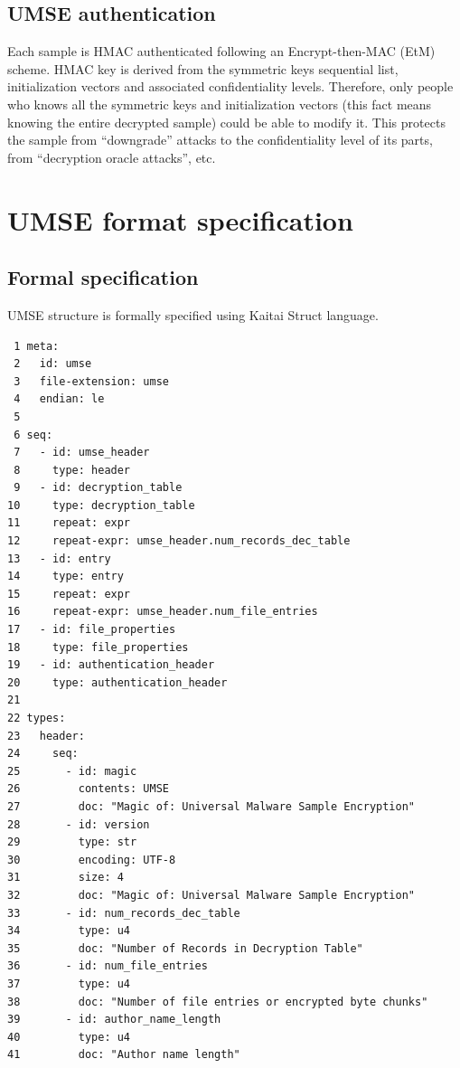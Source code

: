 \subsection{UMSE authentication}

Each sample is HMAC authenticated following an Encrypt-then-MAC (EtM)
scheme\cite{AuthenticatedEncryption2000}. HMAC key is derived from the symmetric keys sequential list,
initialization vectors and associated confidentiality levels. Therefore, only
people who knows all the symmetric keys and initialization vectors (this fact
means knowing the entire decrypted sample) could be able to modify it. This
protects the sample from ``downgrade'' attacks to the confidentiality level of
its parts, from ``decryption oracle attacks'', etc.

\section{UMSE format specification}

\subsection{Formal specification}

UMSE structure is formally specified using Kaitai Struct language\cite{KaitaiStructDoc}.

\begin{tcolorbox}
  \small
\begin{verbatim}
 1 meta:
 2   id: umse
 3   file-extension: umse
 4   endian: le
 5 
 6 seq:
 7   - id: umse_header
 8     type: header 
 9   - id: decryption_table
10     type: decryption_table
11     repeat: expr 
12     repeat-expr: umse_header.num_records_dec_table
13   - id: entry
14     type: entry
15     repeat: expr 
16     repeat-expr: umse_header.num_file_entries
17   - id: file_properties
18     type: file_properties
19   - id: authentication_header
20     type: authentication_header
21 
22 types:
23   header:
24     seq:
25       - id: magic
26         contents: UMSE
27         doc: "Magic of: Universal Malware Sample Encryption" 
28       - id: version
29         type: str
30         encoding: UTF-8
31         size: 4
32         doc: "Magic of: Universal Malware Sample Encryption"
33       - id: num_records_dec_table
34         type: u4 
35         doc: "Number of Records in Decryption Table"
36       - id: num_file_entries
37         type: u4 
38         doc: "Number of file entries or encrypted byte chunks"
39       - id: author_name_length
40         type: u4 
41         doc: "Author name length"
\end{verbatim}
\end{tcolorbox}

